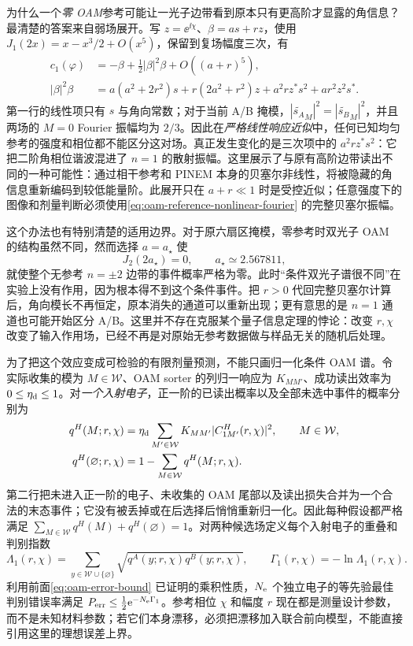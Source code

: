 为什么一个\emph{零 OAM}参考可能让一光子边带看到原本只有更高阶才显露的角信息？最清楚的答案来自弱场展开。写 $z=\ee^{\ii\chi}$、$\beta=a s+r z$，使用 $J_1(2x)=x-x^3/2+O(x^5)$，保留到复场幅度三次，有
\begin{align*}
 c_1(\varphi)
 &=-\beta+\tfrac12|\beta|^2\beta+O((a+r)^5),\\
 |\beta|^2\beta
 &=a(a^2+2r^2)s+r(2a^2+r^2)z
   +a^2r z^*s^2+ar^2z^2s^*.
\end{align*}
第一行的线性项只有 $s$ 与角向常数；对于当前 A/B 掩模，$|\widetilde{s_A}_M|^2=|\widetilde{s_B}_M|^2$，并且两场的 $M=0$ Fourier 振幅均为 $2/3$。因此在\emph{严格线性响应近似}中，任何已知均匀参考的强度和相位都不能区分这对场。真正发生变化的是三次项中的 $a^2r z^*s^2$：它把二阶角相位谐波混进了 $n=1$ 的散射振幅。这里展示了与原有高阶边带读出不同的一种可能性：通过相干参考和 PINEM 本身的贝塞尔非线性，将被隐藏的角信息重新编码到较低能量阶。此展开只在 $a+r\ll1$ 时是受控近似；任意强度下的图像和剂量判断必须使用\cref{eq:oam-reference-nonlinear-fourier} 的完整贝塞尔振幅。

这个办法也有特别清楚的适用边界。对于原六扇区掩模，零参考时双光子 OAM 的结构虽然不同，然而选择 $a=a_\star$ 使
\begin{equation}
 J_2(2a_\star)=0,\qquad a_\star\simeq2.567811,
 \label{eq:oam-reference-bessel-zero}
\end{equation}
就使整个无参考 $n=\pm2$ 边带的事件概率严格为零。此时“条件双光子谱很不同”在实验上没有作用，因为根本得不到这个条件事件。把 $r>0$ 代回完整贝塞尔计算后，角向模长不再恒定，原本消失的通道可以重新出现；更有意思的是 $n=1$ 通道也可能开始区分 A/B。这里并不存在克服某个量子信息定理的悖论：改变 $r,\chi$ 改变了输入作用场，已经不再是对原始无参考数据做与样品无关的随机后处理。

为了把这个效应变成可检验的有限剂量预测，不能只画归一化条件 OAM 谱。令实际收集的模为 $M\in\mathcal W$、OAM sorter 的列归一响应为 $K_{MM'}$、成功读出效率为 $0\le\eta_{\rm d}\le1$。对\emph{一个入射电子}，正一阶的已读出概率以及全部未选中事件的概率分别为
\begin{align}
 q^H(M;r,\chi)&=\eta_{\rm d}\sum_{M'\in\mathcal W}
 K_{MM'}|C_{1M'}^H(r,\chi)|^2,
 \qquad M\in\mathcal W,\\
 q^H(\varnothing;r,\chi)&=1-\sum_{M\in\mathcal W}q^H(M;r,\chi).
 \label{eq:oam-reference-detected-events}
\end{align}
第二行把未进入正一阶的电子、未收集的 OAM 尾部以及读出损失合并为一个合法的末态事件；它没有被丢掉或在后选择后悄悄重新归一化。因此每种假设都严格满足 $\sum_{M\in\mathcal W}q^H(M)+q^H(\varnothing)=1$。对两种候选场定义每个入射电子的重叠和判别指数
\begin{equation}
 \Lambda_1(r,\chi)=\sum_{y\in\mathcal W\cup\{\varnothing\}}
 \sqrt{q^A(y;r,\chi)q^B(y;r,\chi)},\qquad
 \Gamma_1(r,\chi)=-\ln\Lambda_1(r,\chi).
 \label{eq:oam-reference-per-electron-rate}
\end{equation}
利用前面\cref{eq:oam-error-bound} 已证明的乘积性质，$N_{\rm e}$ 个独立电子的等先验最佳判别错误率满足 $P_{\rm err}\le\tfrac12\mathrm{e}^{-N_{\rm e}\Gamma_1}$。参考相位 $\chi$ 和幅度 $r$ 现在都是测量设计参数，而不是未知材料参数；若它们本身漂移，必须把漂移加入联合前向模型，不能直接引用这里的理想误差上界。

